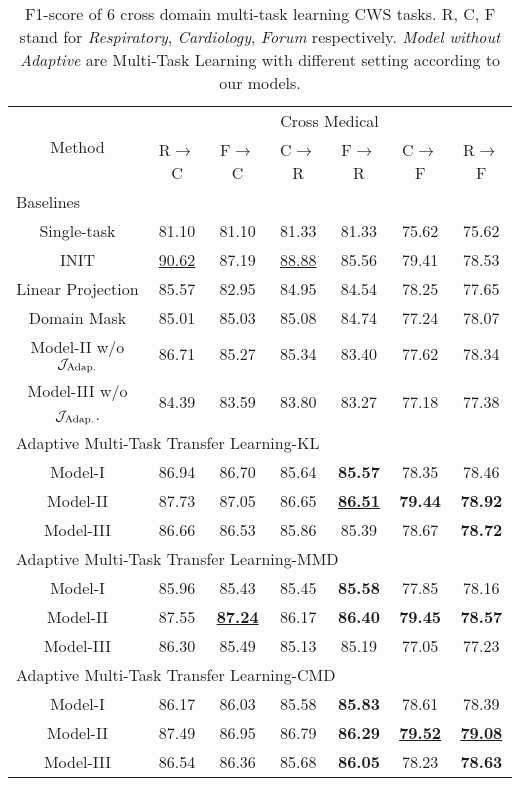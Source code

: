 \begin{table*}[t!]
\small
\centering
\caption{F1-score of 6 cross domain multi-task learning CWS tasks. R, C, F stand for \textit{Respiratory}, \textit{Cardiology}, \textit{Forum} respectively. \textit{Model without Adaptive} are Multi-Task Learning with different setting according to our models. }\label{table:experiment}
\begin{tabular}{|c|c|c|c|c|c|c|}
\hline
\multirow{2}{*}{Method} & \multicolumn{6}{c|}{Cross Medical}\\ \cline{2-7} & R$\rightarrow$C & F$\rightarrow$C & C$\rightarrow$R & F$\rightarrow$R & C$\rightarrow$F & R$\rightarrow$F\\
\hline
\hline
\multicolumn{7}{|l|}{Baselines} \\
\hline
Single-task & 81.10 & 81.10 & 81.33 & 81.33  & 75.62 & 75.62\\
\hline
INIT & \underline{90.62} & 87.19 & \underline{88.88} & 85.56 & 79.41 & 78.53\\
\hline
Linear Projection & 85.57 & 82.95 & 84.95 & 84.54 & 78.25 & 77.65 \\
\hline
Domain Mask & 85.01 & 85.03 & 85.08 & 84.74 & 77.24 & 78.07 \\
\hline
Model-\RN{2} w/o $\mathcal{J}_\textnormal{Adap.}$ & 86.71 & 85.27 & 85.34 & 83.40 & 77.62 & 78.34\\
\hline
Model-\RN{3} w/o $\mathcal{J}_\textnormal{Adap.}$. & 84.39 &  83.59 & 83.80 & 83.27 & 77.18 & 77.38\\
\hline
\hline
\multicolumn{7}{|l|}{Adaptive Multi-Task Transfer Learning-KL} \\
\hline
Model-\RN{1} & 86.94 & 86.70 & 85.64 & \textbf{85.57} & 78.35 & 78.46\\
\hline
Model-\RN{2} & 87.73 & 87.05 & 86.65 & \textbf{\underline{86.51}} & \textbf{79.44} & \textbf{78.92}\\
\hline
Model-\RN{3} & 86.66 & 86.53 & 85.86 & 85.39 & 78.67 & \textbf{78.72}\\
\hline
\hline
\multicolumn{7}{|l|}{Adaptive Multi-Task Transfer Learning-MMD} \\
\hline
Model-\RN{1} & 85.96 & 85.43 & 85.45 & \textbf{85.58} & 77.85 & 78.16\\
\hline
Model-\RN{2} & 87.55 & \textbf{\underline{87.24}} & 86.17 & \textbf{86.40} & \textbf{79.45} & \textbf{78.57}\\
\hline
Model-\RN{3} & 86.30 & 85.49 & 85.13 & 85.19 & 77.05 & 77.23\\
\hline
\hline
\multicolumn{7}{|l|}{Adaptive Multi-Task Transfer Learning-CMD} \\
\hline
Model-\RN{1} & 86.17 & 86.03 & 85.58 & \textbf{85.83} & 78.61 & 78.39\\
\hline
Model-\RN{2} & 87.49 & 86.95 & 86.79 & \textbf{86.29} & \textbf{\underline{79.52}} & \textbf{\underline{79.08}}\\
\hline
Model-\RN{3} & 86.54 & 86.36 & 85.68 & \textbf{86.05} & 78.23 & \textbf{78.63}\\
\hline
\end{tabular}
\end{table*}

